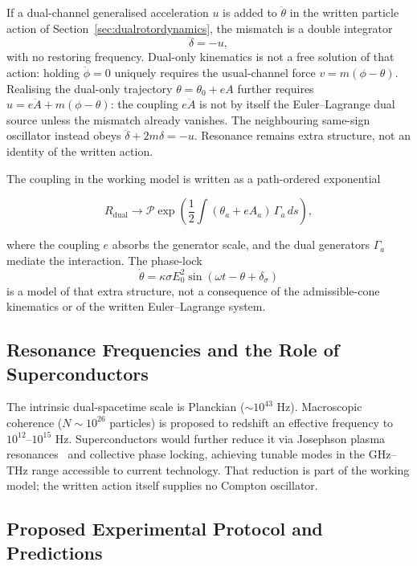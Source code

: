\documentclass[a4paper]{article}
\begin{document}
If a dual-channel generalised acceleration $u$ is added to $\ddot\theta$ in the written particle action of Section~\ref{sec:dualrotordynamics}, the mismatch is a double integrator
\[
\ddot\delta=-u,
\]
with no restoring frequency. Dual-only kinematics is not a free solution of that action: holding $\ddot\phi=0$ uniquely requires the usual-channel force $v=m(\phi-\theta)$. Realising the dual-only trajectory $\theta=\theta_0+eA$ further requires $u=e\ddot A+m(\phi-\theta)$: the coupling $e\ddot A$ is not by itself the Euler--Lagrange dual source unless the mismatch already vanishes. The neighbouring same-sign oscillator instead obeys $\ddot\delta+2m\delta=-u$. Resonance remains extra structure, not an identity of the written action.

The coupling in the working model is written as a path-ordered exponential

\[
R_{\text{dual}} \to \mathcal{P} \exp\!\left( \frac{1}{2} \int (\theta_a + e A_a)\, \Gamma_a \, ds \right),
\]

where the coupling $e$ absorbs the generator scale, and the dual generators $\Gamma_a$ mediate the interaction. The phase-lock
\[
\dot{\theta} = \kappa \sigma E_0^2 \sin(\omega t - \theta + \delta_\sigma)
\]
is a model of that extra structure, not a consequence of the admissible-cone kinematics or of the written Euler--Lagrange system.

\subsection{Resonance Frequencies and the Role of Superconductors}

The intrinsic dual-spacetime scale is Planckian ($\sim 10^{43}$ Hz). Macroscopic coherence ($N \sim 10^{26}$ particles) is proposed to redshift an effective frequency to $10^{12}$--$10^{15}$ Hz. Superconductors would further reduce it via Josephson plasma resonances~\cite{josephson1962} and collective phase locking, achieving tunable modes in the GHz--THz range accessible to current technology. That reduction is part of the working model; the written action itself supplies no Compton oscillator.

\subsection{Proposed Experimental Protocol and Predictions}
\end{document}
